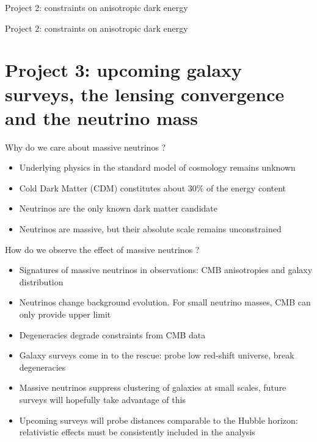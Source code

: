 \documentclass{beamer}
\begin{document}
\begin{frame}{Project 2: constraints on anisotropic dark energy}

\end{frame}

\begin{frame}{Project 2: constraints on anisotropic dark energy}

\end{frame}


\section*{Project 3: upcoming galaxy surveys, the lensing convergence and the neutrino mass}

\begin{frame}{Why do we care about massive neutrinos ?}
\begin{itemize}
\item Underlying physics in the standard model of cosmology remains unknown
\item Cold Dark Matter (CDM) constitutes  about $30\%$ of the energy content
\item Neutrinos are the only known dark matter candidate
\item Neutrinos are massive, but their absolute scale remains unconstrained
\end{itemize}
\end{frame}

\begin{frame}{How do we observe the effect of massive neutrinos ?}
\begin{itemize}
\item Signatures of massive neutrinos in observations: CMB anisotropies and galaxy distribution
\item Neutrinos change background evolution. For small neutrino masses, CMB can only provide upper limit 
\item Degeneracies degrade constraints from CMB data
\item Galaxy surveys come in to the rescue: probe low red-shift universe, break degeneracies
\item Massive neutrinos suppress clustering of galaxies at small scales, future surveys will hopefully take advantage of this
\item Upcoming surveys will probe distances comparable to the Hubble horizon: relativistic effects must be consistently included in the analysis
\end{itemize}

\end{frame}
\end{document}
